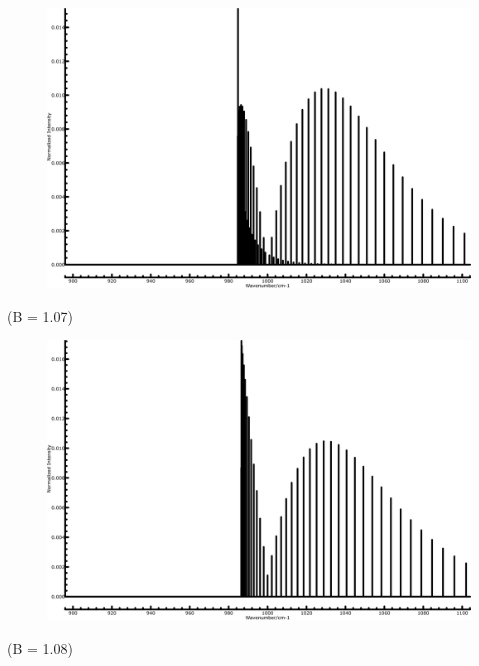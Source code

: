 \begin{center}
	\begin{minipage}{\linewidth}
		\begin{minipage}{0.5\linewidth}
			\begin{figure}[H]
				\centering \includegraphics[width=\linewidth] 						{figures/B107.png}
			\end{figure} 
				\centering(B = 1.07) \\
		\end{minipage}
		\begin{minipage}{0.5\linewidth}
		   \begin{figure}[H]
				\centering \includegraphics[width=\linewidth]	  					{figures/B108.png}
			\end{figure}
				\centering(B = 1.08) \\
		\end{minipage}
	\end{minipage}
\end{center}
